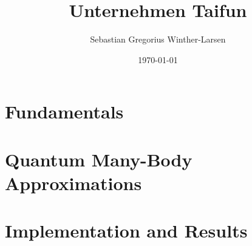 \documentclass[twoside, english, notitlepage, 10pt]{uiofysmaster}
\author{Sebastian Gregorius Winther-Larsen}
\title{Unternehmen Taifun}
\date{\today}
\begin{document}
\frontmatter
    \maketitle

    \setcounter{tocdepth}{1}
    \tableofcontents

\mainmatter

    \part{Fundamentals}

        
        

    \part{Quantum Many-Body Approximations}

        
        
        

    \part{Implementation and Results}

                

        

    \appendix

        
        
        
        
\printbibliography
\end{document}
